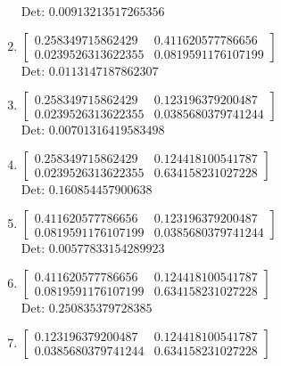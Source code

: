 \documentclass[12pt]{article}
\begin{document}
\begin{enumerate}
Det: $0.00913213517265356$\\

\item $\displaystyle \left[\begin{matrix}0.258349715862429 & 0.411620577786656\\0.0239526313622355 & 0.0819591176107199\end{matrix}\right]$\\

Det: $0.0113147187862307$\\

\item $\displaystyle \left[\begin{matrix}0.258349715862429 & 0.123196379200487\\0.0239526313622355 & 0.0385680379741244\end{matrix}\right]$\\

Det: $0.00701316419583498$\\

\item $\displaystyle \left[\begin{matrix}0.258349715862429 & 0.124418100541787\\0.0239526313622355 & 0.634158231027228\end{matrix}\right]$\\

Det: $0.160854457900638$\\

\item $\displaystyle \left[\begin{matrix}0.411620577786656 & 0.123196379200487\\0.0819591176107199 & 0.0385680379741244\end{matrix}\right]$\\

Det: $0.00577833154289923$\\

\item $\displaystyle \left[\begin{matrix}0.411620577786656 & 0.124418100541787\\0.0819591176107199 & 0.634158231027228\end{matrix}\right]$\\

Det: $0.250835379728385$\\

\item $\displaystyle \left[\begin{matrix}0.123196379200487 & 0.124418100541787\\0.0385680379741244 & 0.634158231027228\end{matrix}\right]$\\


\end{enumerate}
\end{document}
